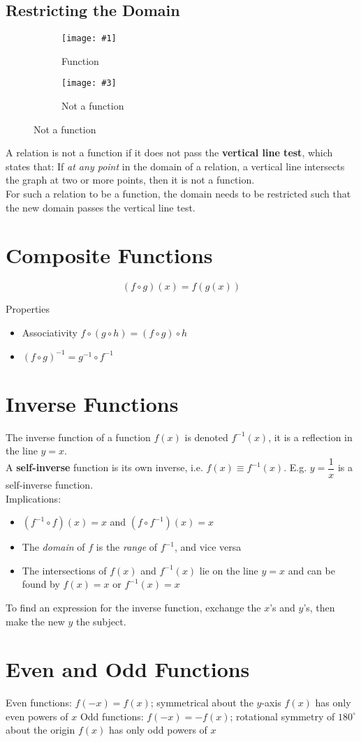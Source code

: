 \documentclass[11pt]{article}
\newcommand{\degsym}{^{\circ}}
\newcommand{\lb}{\\[8pt]}
\newcommand{\doubleimg}[4]{\begin{center}
  \begin{figure}[H]
    \centering
    \begin{subfigure}{.45\textwidth}
      \centering
      \texttt{[image: \#1]}
      \caption{#2}
      \label{fig:sub1}
    \end{subfigure}
    \begin{subfigure}{.45\textwidth}
      \centering
      \texttt{[image: \#3]}
      \caption{#4}
      \label{fig:sub2}
    \end{subfigure}
  \end{figure}
\end{center}}
\begin{document}
\pagebreak

\subsection{Restricting the Domain}

\doubleimg{figs/isfn.png}{Function}{figs/nofn.png}{Not a function}

\noindent A relation is not a function if it does not pass the \textbf{vertical line test}, which states that: If \textit{at any point} in the domain of a relation, a vertical line intersects the graph at two or more points, then it is not a function.\lb
For such a relation to be a function, the domain needs to be restricted such that the new domain passes the vertical line test.

\pagebreak

\section{Composite Functions}

$$(f \circ g)(x) = f(g(x))$$

Properties
\begin{itemize}
  \item Associativity $f\circ (g\circ h) = (f\circ g)\circ h$
  \item $(f\circ g)^{-1} = g^{-1} \circ f^{-1}$
\end{itemize}

\section{Inverse Functions}
The inverse function of a function $f(x)$ is denoted $f^{-1}(x)$, it is a reflection in the line $y = x$.\lb
A \textbf{self-inverse} function is its own inverse, i.e. $f(x) \equiv f^{-1}(x)$. E.g. $y = \dfrac{1}{x}$ is a self-inverse function.\lb
Implications:
\begin{itemize}
  \item $(f^{-1} \circ f)(x) = x$ and $(f \circ f^{-1})(x) = x$
  \item The \textit{domain} of $f$ is the \textit{range} of $f^{-1}$, and vice versa
  \item The intersections of $f(x)$ and $f^{-1}(x)$ lie on the line $y = x$ and can be found by $f(x) = x$ or $f^{-1}(x) = x$
\end{itemize}
To find an expression for the inverse function, exchange the $x$'s and $y$'s, then make the new $y$ the subject.

\section{Even and Odd Functions}

\begin{outline}[enumerate]
  \1 Even functions: $f(-x) = f(x)$; symmetrical about the $y$-axis
  \2 $f(x)$ has only even powers of $x$
  \1 Odd functions: $f(-x) = -f(x)$; rotational symmetry of $180\degsym$ about the origin
  \2 $f(x)$ has only odd powers of $x$
\end{outline}
\end{document}
